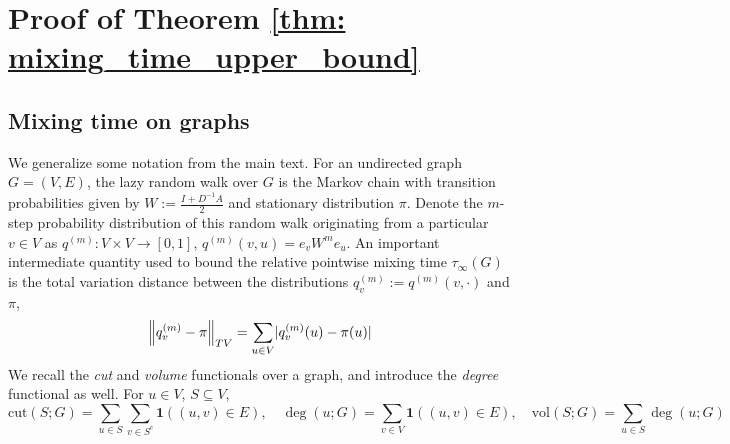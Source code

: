 \documentclass[11pt,twoside]{article}
\DeclarePairedDelimiter\abs{\lvert}{\rvert}
\newcommand{\vol}{\mathrm{vol}}
\newcommand{\cut}{\mathrm{cut}}
\newcommand{\norm}[1]{\left\lVert#1\right\rVert}
\newcommand{\1}{\mathbf{1}}
\newcommand{\Err}{\mathrm{Err}}
\newcommand{\Abf}{A}
\newcommand{\Wbf}{W}
\newcommand{\Dbf}{D}
\newcommand{\Ibf}[1]{I_{#1}}
\begin{document}

\section{Proof of Theorem \ref{thm: mixing_time_upper_bound}}

\subsection{Mixing time on graphs}
\label{sec: mixing_time_on_graphs}

We generalize some notation from the main text. For an undirected graph $G = (V,E)$, the lazy random walk over $G$ is the Markov chain with transition probabilities given by $\Wbf := \frac{\Ibf{} + \Dbf^{-1} \Abf}{2}$ and stationary distribution $\pi$.  Denote the $m$-step probability distribution of this random walk originating from a particular $v \in V$ as $q^{(m)}: V \times V \to [0,1]$, $q^{(m)}(v,u) = e_v \Wbf^m e_u$. An important intermediate quantity used to bound the relative pointwise mixing time $\tau_{\infty}(G)$ is the total variation distance between the distributions $q_v^{(m)} := q^{(m)}(v,\cdot)$ and $\pi$,
\begin{equation*}
\norm{q_v^{(m)} - \pi}_{TV} = \sum_{u \in V} \abs{q_v^{(m)}(u) - \pi(u)}
\end{equation*}
We recall the \emph{cut} and \emph{volume} functionals over a graph, and introduce the \emph{degree} functional as well. For $u \in V$, $S \subseteq V$, 
\begin{equation*}
\cut(S;G) = \sum_{u \in S} \sum_{v \in S^c} \1((u,v) \in E), \quad \deg(u;G) = \sum_{v \in V} \1((u,v) \in E), \quad \vol(S;G) = \sum_{u \in S} \deg(u;G)
\end{equation*}
\end{document}
